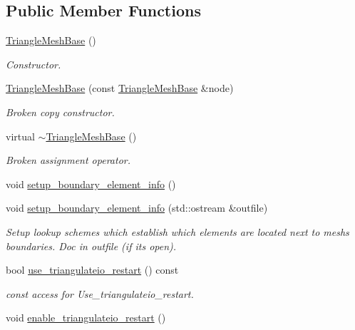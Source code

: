 \subsection*{Public Member Functions}
\begin{DoxyCompactItemize}
\item 
\hyperlink{classoomph_1_1TriangleMeshBase_afdfa2e68988d225301a9a262883ddf62}{Triangle\+Mesh\+Base} ()
\begin{DoxyCompactList}\small\item\em Constructor. \end{DoxyCompactList}\item 
\hyperlink{classoomph_1_1TriangleMeshBase_a598613709db807336487fbe2657e905e}{Triangle\+Mesh\+Base} (const \hyperlink{classoomph_1_1TriangleMeshBase}{Triangle\+Mesh\+Base} \&node)
\begin{DoxyCompactList}\small\item\em Broken copy constructor. \end{DoxyCompactList}\item 
virtual \hyperlink{classoomph_1_1TriangleMeshBase_af827bac0e7a180b179a835c4db2a8228}{$\sim$\+Triangle\+Mesh\+Base} ()
\begin{DoxyCompactList}\small\item\em Broken assignment operator. \end{DoxyCompactList}\item 
void \hyperlink{classoomph_1_1TriangleMeshBase_aa78fe0d750c842df53e1fa2237205e51}{setup\+\_\+boundary\+\_\+element\+\_\+info} ()
\item 
void \hyperlink{classoomph_1_1TriangleMeshBase_a187fd9dbc558b9d19a02d92ce876507c}{setup\+\_\+boundary\+\_\+element\+\_\+info} (std\+::ostream \&outfile)
\begin{DoxyCompactList}\small\item\em Setup lookup schemes which establish which elements are located next to mesh\textquotesingle{}s boundaries. Doc in outfile (if it\textquotesingle{}s open). \end{DoxyCompactList}\item 
bool \hyperlink{classoomph_1_1TriangleMeshBase_a69a2fe3d5e77ec39b9df4b3174b58c47}{use\+\_\+triangulateio\+\_\+restart} () const
\begin{DoxyCompactList}\small\item\em const access for Use\+\_\+triangulateio\+\_\+restart. \end{DoxyCompactList}\item 
void \hyperlink{classoomph_1_1TriangleMeshBase_ad3f02167046a1f96481b87dc48b09032}{enable\+\_\+triangulateio\+\_\+restart} ()

\end{DoxyCompactItemize}
